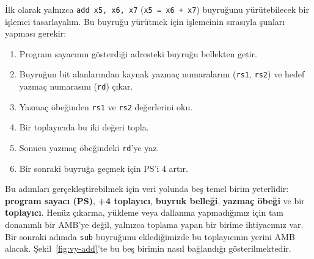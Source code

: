 İlk olarak yalnızca \texttt{add x5, x6, x7} (\texttt{x5 = x6 + x7}) buyruğunu yürütebilecek bir işlemci tasarlayalım. Bu buyruğu yürütmek için işlemcinin sırasıyla şunları yapması gerekir:
\begin{enumerate}
    \item Program sayacının gösterdiği adresteki buyruğu bellekten getir.
    \item Buyruğun bit alanlarından kaynak yazmaç numaralarını (\texttt{rs1}, \texttt{rs2}) ve hedef yazmaç numarasını (\texttt{rd}) çıkar.
    \item Yazmaç öbeğinden \texttt{rs1} ve \texttt{rs2} değerlerini oku.
    \item Bir toplayıcıda bu iki değeri topla.
    \item Sonucu yazmaç öbeğindeki \texttt{rd}'ye yaz.
    \item Bir sonraki buyruğa geçmek için PS'i 4 artır.
\end{enumerate}

Bu adımları gerçekleştirebilmek için veri yolunda beş temel birim yeterlidir: \textbf{program sayacı (PS)}, \textbf{+4 toplayıcı}, \textbf{buyruk belleği}, \textbf{yazmaç öbeği} ve bir \textbf{toplayıcı}. Henüz çıkarma, yükleme veya dallanma yapmadığımız için tam donanımlı bir AMB'ye değil, yalnızca toplama yapan bir birime ihtiyacımız var. Bir sonraki adımda \texttt{sub} buyruğunu eklediğimizde bu toplayıcının yerini AMB alacak. Şekil~\ref{fig:vy-add}'te bu beş birimin nasıl bağlandığı gösterilmektedir.

